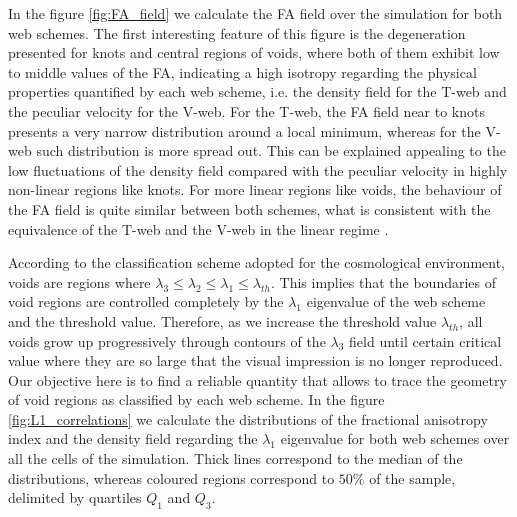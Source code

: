 \documentclass[a4,useAMS,usenatbib,usegraphicx]{latex/mn2e}
\begin{document}
In the figure \ref{fig:FA_field} we calculate the FA field over the 
simulation for both web schemes. The first interesting feature of this
figure is the degeneration presented for knots and central regions of 
voids, where both of them exhibit low to middle values of the FA, 
indicating a high isotropy regarding the physical properties quantified by 
each web scheme, i.e. the density field for the T-web and the peculiar 
velocity for the V-web. For the T-web, the FA field near to knots presents 
a very narrow distribution around a local minimum, whereas for the V-web 
such distribution is more spread out. This can be explained appealing to 
the low fluctuations of the density field compared with the peculiar 
velocity in highly non-linear regions like knots. For more linear regions 
like voids, the behaviour of the FA field is quite similar between both 
schemes, what is consistent with the equivalence of the T-web and the 
V-web in the linear regime .


According to the classification scheme adopted for the cosmological 
environment, voids are regions where 
$\lambda_3\leq\lambda_2\leq\lambda_1\leq\lambda_{th}$. This implies that
the boundaries of void regions are controlled completely by the $\lambda_1$
eigenvalue of the web scheme and the threshold value. Therefore, as we 
increase the threshold value $\lambda_{th}$, all voids grow up 
progressively through contours of the $\lambda_3$ field until certain 
critical value where they are so large that the visual impression is no 
longer reproduced. Our objective here is to find a reliable quantity that 
allows to trace the geometry of void regions as classified by each web 
scheme. In the figure \ref{fig:L1_correlations} we calculate the 
distributions of the fractional anisotropy index and the density field 
regarding the $\lambda_1$ eigenvalue for both web schemes over all the 
cells of the simulation. Thick lines correspond to the median of the 
distributions, whereas coloured regions correspond to $50\%$ of the
sample, delimited by quartiles $Q_1$ and $Q_3$. 
\end{document}
